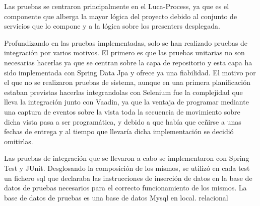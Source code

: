 	\vspace{5mm}
	
	Las pruebas se centraron principalmente en el Luca-Process, ya que es el componente que alberga la mayor lógica del proyecto debido al conjunto de servicios que lo compone y a la lógica sobre los presenters desplegada.
	
	\vspace{5mm}
	
	Profundizando en las pruebas implementadas, solo se han realizado pruebas de integración por varios motivos. El primero es que las pruebas unitarias no son necesarias hacerlas ya que se centran sobre la capa de repositorio y esta capa ha sido implementada con Spring Data Jpa\cite{jpa} y ofrece ya una fiabilidad. El motivo por el que no se realizaron pruebas de sistema, aunque en una primera planificación estaban previstas hacerlas integrandolas con Selenium\cite{selenium} fue la complejidad que lleva la integración junto con Vaadin\cite{vaadin}, ya que la ventaja de programar mediante una captura de eventos sobre la vista toda la secuencia de movimiento sobre dicha vista pasa a ser programática, y debido a que había que ceñirse a unas fechas de entrega y al tiempo que llevaría dicha implementación se decidió omitirlas.
	
	\vspace{5mm}
	
	Las pruebas de integración que se llevaron a cabo se implementaron con Spring Test\cite{springTest} y JUnit\cite{junit}. Desglosando la composición de los mismos, se utilizó en cada test un fichero sql que declaraba las instrucciones de inserción de datos en la base de datos de pruebas necesarios para el correcto funcionamiento de los mismos. La base de datos de pruebas es una base de datos Mysql en local. relacional 
 




	 